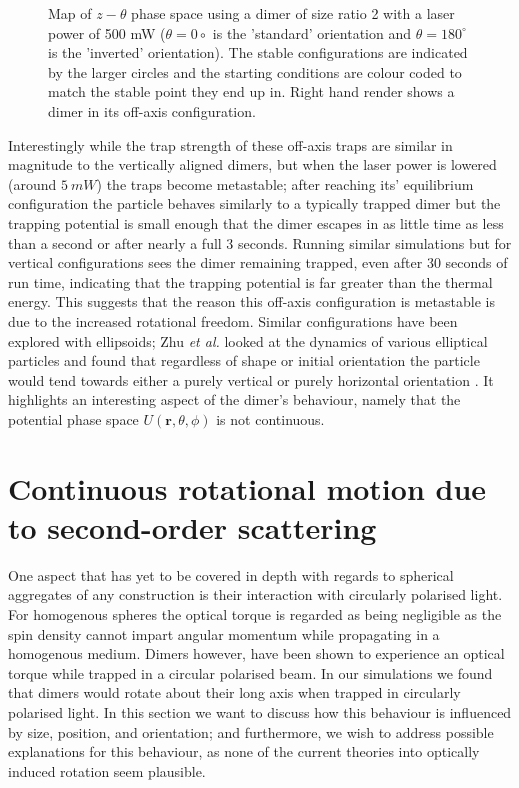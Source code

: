 \begin{figure}[h!]
\begin{subfigure}{0.32\linewidth}
		\caption{}
	\end{subfigure}
	\caption{Map of $z-\theta$ phase space using a dimer of size ratio 2 with 
		a laser power of 500 mW ($\theta=0\circ$ is the 'standard' orientation 
		and $\theta=180^\circ$ is the 'inverted' orientation). The stable 
		configurations are indicated by the larger circles and the starting 
		conditions are colour coded to match the stable point they end up in. 
		Right hand render shows a dimer in its off-axis configuration.}
	\label{fig:off_axis}
\end{figure}

Interestingly while the trap strength of these off-axis traps are similar 
in magnitude to the vertically aligned dimers, but when the laser power 
is lowered (around $5\ mW$) the traps become metastable; after reaching its'
equilibrium configuration the particle behaves similarly to a typically
trapped dimer but the trapping potential is small enough that the dimer
escapes in as little time as less than a second or after nearly a full 
3 seconds. Running similar simulations but for vertical configurations 
sees the dimer remaining trapped, even after 30 seconds of run time, 
indicating that the trapping potential is far greater than the thermal 
energy. This suggests that the reason this off-axis configuration is 
metastable is due to the increased rotational freedom. Similar 
configurations have been explored with ellipsoids; Zhu \textit{et al.} 
looked at the dynamics of various elliptical particles and found that 
regardless of shape or initial orientation the particle would tend towards
either a purely vertical or purely horizontal orientation \cite{Zhu2021}. 
It highlights an interesting aspect of the dimer's behaviour, namely that 
the potential phase space $U(\textbf{r}, \theta, \phi)$ is not continuous. 

\section{Continuous rotational motion due to second-order scattering}
One aspect that has yet to be covered in depth with regards to spherical 
aggregates of any construction is their interaction with circularly 
polarised light. For homogenous spheres the optical torque is regarded as
being negligible as the spin density cannot impart angular momentum while 
propagating in a homogenous medium. Dimers however, have been shown to
experience an optical torque \cite{Vigilante2020, Ahn2018, Reimann2018} 
while trapped in a circular polarised beam. In our simulations we found 
that dimers would rotate about their long axis when trapped in circularly
polarised light. In this section we want to discuss how this behaviour 
is influenced by size, position, and orientation; and furthermore, we wish
to address possible explanations for this behaviour, as none of the current
theories into optically induced rotation seem plausible.


